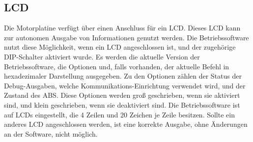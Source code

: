 \subsection{LCD}
Die Motorplatine verfügt über einen Anschluss für ein LCD. Dieses LCD kann zur autonomen Ausgabe
von Informationen genutzt werden. Die Betriebssoftware nutzt diese Möglichkeit,
wenn ein LCD angeschlossen ist, und der zugehörige DIP-Schalter aktiviert wurde.
Es werden die aktuelle Version der Betriebssoftware, die Optionen und, falls vorhanden,
der aktuelle Befehl in hexadezimaler Darstellung ausgegeben. Zu den Optionen zählen der Status der Debug-Ausgaben,
welche Kommunikations-Einrichtung verwendet wird, und der Zustand des ABS. Diese Optionen
werden groß geschrieben, wenn sie aktiviert sind, und klein geschrieben, wenn sie
deaktiviert sind. Die Betriebssoftware ist auf LCDs eingestellt, die 4 Zeilen und 20 Zeichen je Zeile besitzen.
Sollte ein anderes LCD angeschlossen werden, ist eine korrekte Ausgabe, ohne
Änderungen an der Software, nicht möglich.
